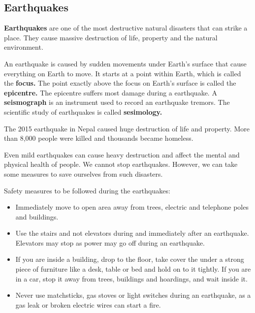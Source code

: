 \subsection{\textbf{Earthquakes}}
\textbf{Earthquakes} are one of the most destructive natural disasters that can strike a place. They cause massive destruction of life, property and the natural environment.
\vspace{0.1in}
\par
An earthquake is caused by sudden movements under Earth's surface that cause everything on Earth to move. It starts at a point within Earth, which is called the \textbf{focus.} The point exactly above the focus on Earth's surface is called the \textbf{epicentre.} The epicentre suffers most damage during a earthquake. A \textbf{seismograph} is an instrument used to record an earthquake tremors. The scientific study of earthquakes is called \textbf{sesimology.}
\vspace{0.4in}
\par
The 2015 earthquake in Nepal caused huge destruction of life and property. More than 8,000 people were killed and thousands became homeless.
\vspace{0.1in}
\par
Even mild earthquakes can cause heavy destruction and affect the mental and physical health of people. We cannot stop earthquakes. However, we can take some measures to save ourselves from such disasters.
\vspace{0.1in}
\par
Safety measures to be followed during the earthquakes:
\begin{itemize}
    \item Immediately move to open area away from trees, electric and telephone poles and buildings.
    \item Use the stairs and not elevators during and immediately after an earthquake. Elevators may stop as power may go off during an earthquake.
    \item If you are inside a building, drop to the floor, take cover the under a strong piece of furniture like a desk, table or bed and hold on to it tightly.
    \vspace{1.6in}
    If you are in a car, stop it away from trees, buildings and hoardings, and wait inside it.
    \item Never use matchsticks, gas stoves or light switches during an earthquake, as a gas leak or broken electric wires can start a fire.
\end{itemize}
